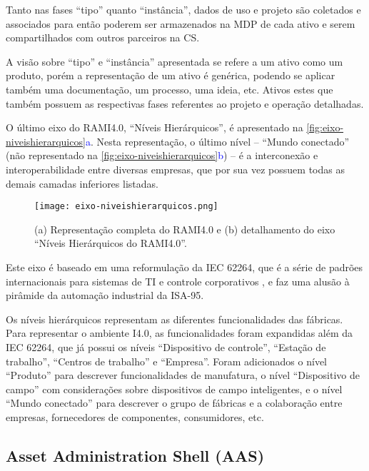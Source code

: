 Tanto nas fases ``tipo'' quanto ``instância'', dados de uso e projeto são coletados e associados para então poderem ser armazenados na MDP de cada ativo e serem compartilhados com outros parceiros na CS.

A visão sobre ``tipo'' e ``instância'' apresentada se refere a um ativo como um produto, porém a representação de um ativo é genérica, podendo se aplicar também uma documentação, um processo, uma ideia, etc. Ativos estes que também possuem as respectivas fases referentes ao projeto e operação detalhadas.

O último eixo do RAMI4.0, ``Níveis Hierárquicos'', é apresentado na \autoref{fig:eixo-niveishierarquicos}\textcolor{blue}{a}. Nesta representação, o último nível -- ``Mundo conectado'' (não representado na \autoref{fig:eixo-niveishierarquicos}\textcolor{blue}{b}) -- é a interconexão e interoperabilidade entre diversas empresas, que por sua vez possuem todas as demais camadas inferiores listadas.

\begin{figure}[htb]
	\centering
	\texttt{[image: eixo-niveishierarquicos.png]}
	\caption{(a) Representação completa do RAMI4.0 e (b) detalhamento do eixo ``Níveis Hierárquicos do RAMI4.0''.}
	\label{fig:eixo-niveishierarquicos}
\end{figure}

Este eixo é baseado em uma reformulação da IEC 62264, que é a série de padrões internacionais para sistemas de TI e controle corporativos \cite{hankel2015rami}, e faz uma alusão à pirâmide da automação industrial da ISA-95.

Os níveis hierárquicos representam as diferentes funcionalidades das fábricas. Para representar o ambiente I4.0, as funcionalidades foram expandidas além da IEC 62264, que já possui os níveis ``Dispositivo de controle'', ``Estação de trabalho'', ``Centros de trabalho'' e ``Empresa''. Foram adicionados o nível ``Produto'' para descrever funcionalidades de manufatura, o nível ``Dispositivo de campo'' com considerações sobre dispositivos de campo inteligentes, e o nível ``Mundo conectado'' para descrever o grupo de fábricas e a colaboração entre empresas, fornecedores de componentes, consumidores, etc.

\subsection{Asset Administration Shell (AAS)}

